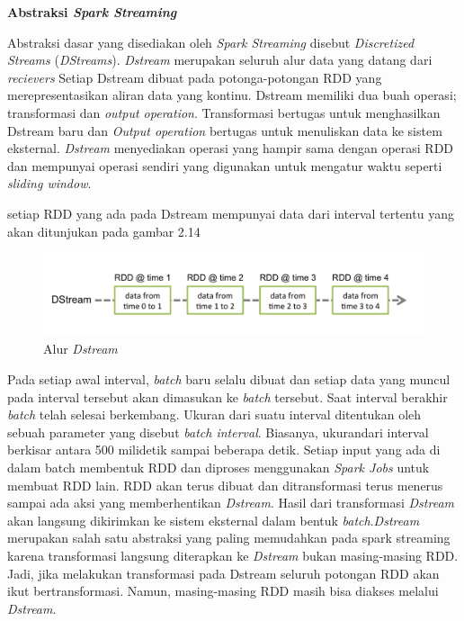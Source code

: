 \documentclass[a4paper,twoside]{article}
\begin{document}
\begin{enumerate}
		\textbf{Abstraksi \textit{Spark Streaming}}\newline
		
		Abstraksi dasar yang disediakan oleh \textit{Spark Streaming} disebut \textit{Discretized 				Streams} (\textit{DStreams}). \textit{Dstream} merupakan seluruh alur data yang datang dari 			\textit{recievers} Setiap Dstream dibuat pada potonga-potongan RDD yang merepresentasikan 				aliran data yang kontinu. Dstream memiliki dua buah operasi; transformasi dan \textit{output 		operation}. Transformasi bertugas untuk menghasilkan Dstream baru dan \textit{Output 					operation} bertugas untuk menuliskan data ke sistem eksternal. \textit{Dstream} menyediakan 			operasi yang hampir sama dengan operasi RDD dan mempunyai operasi sendiri yang digunakan 				untuk mengatur waktu seperti \textit{sliding window}.
 
		setiap RDD yang ada pada Dstream mempunyai data dari interval tertentu yang akan ditunjukan 			pada gambar 2.14

		\begin{figure}[H] 
		\centering  
		\includegraphics[scale=0.7]{streaming-dstream}  
		\caption[Gambar Alur {\it Dstream}]{Alur {\it Dstream}} 
		\label{fig:processing-events relationship} 
		\end{figure}

		Pada setiap awal interval, \textit{batch} baru selalu dibuat dan setiap data yang muncul 				pada interval tersebut akan dimasukan ke \textit{batch} tersebut. Saat interval berakhir 				\textit{batch} telah selesai berkembang. Ukuran dari suatu interval ditentukan oleh sebuah 				parameter yang disebut \textit{batch interval}. Biasanya, ukurandari interval berkisar 					antara 500 milidetik sampai beberapa detik. Setiap input yang ada di dalam batch membentuk 				RDD dan diproses menggunakan \textit{Spark Jobs} untuk membuat RDD lain. RDD akan terus 				dibuat dan ditransformasi terus menerus sampai ada aksi yang memberhentikan 							\textit{Dstream}. Hasil dari transformasi \textit{Dstream} akan langsung dikirimkan ke 					sistem eksternal dalam bentuk \textit{batch}.\newline \textit{Dstream} merupakan salah satu 			abstraksi yang paling memudahkan pada spark streaming karena transformasi langsung 						diterapkan ke \textit{Dstream} bukan masing-masing RDD. Jadi, jika melakukan transformasi 				pada Dstream seluruh potongan RDD akan ikut bertransformasi. Namun, masing-masing RDD masih 			bisa diakses melalui \textit{Dstream}.


\end{enumerate}
\end{document}
